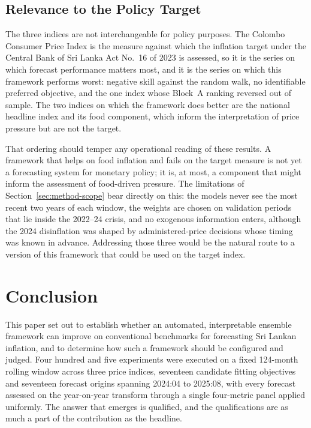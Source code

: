 \documentclass[12pt]{article}
\begin{document}
\subsection{Relevance to the Policy Target}

The three indices are not interchangeable for policy purposes. The Colombo
Consumer Price Index is the measure against which the inflation target under
the Central Bank of Sri Lanka Act No.~16 of 2023 is assessed, so it is the
series on which forecast performance matters most, and it is the series on
which this framework performs worst: negative skill against the random walk, no
identifiable preferred objective, and the one index whose Block~A ranking
reversed out of sample. The two indices on which the framework does better are
the national headline index and its food component, which inform the
interpretation of price pressure but are not the target.

That ordering should temper any operational reading of these results. A
framework that helps on food inflation and fails on the target measure is not
yet a forecasting system for monetary policy; it is, at most, a component
that might inform the assessment of food-driven pressure. The limitations of
Section~\ref{sec:method-scope} bear directly on this: the models never see the
most recent two years of each window, the weights are chosen on validation
periods that lie inside the 2022--24 crisis, and no exogenous information
enters, although the 2024 disinflation was shaped by administered-price
decisions whose timing was known in advance. Addressing those three would be
the natural route to a version of this framework that could be used on the
target index.

\section{Conclusion}
\label{sec:conclusion}

This paper set out to establish whether an automated, interpretable ensemble
framework can improve on conventional benchmarks for forecasting Sri Lankan
inflation, and to determine how such a framework should be configured and
judged. Four hundred and five experiments were executed on a fixed
124-month rolling window across three price indices, seventeen candidate
fitting objectives and seventeen forecast origins spanning 2024:04 to 2025:08,
with every forecast assessed on the year-on-year transform through a single
four-metric panel applied uniformly. The answer that emerges is qualified, and the
qualifications are as much a part of the contribution as the headline.
\end{document}
